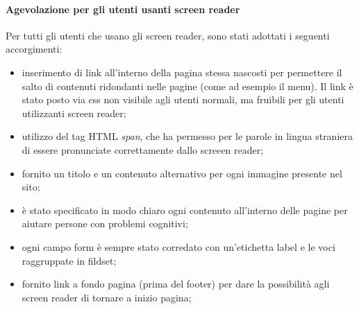 \paragraph*{Agevolazione per gli utenti usanti screen reader}Per tutti gli utenti che usano gli screen reader, sono stati adottati i seguenti accorgimenti:
\begin{itemize}

    \item inserimento di link all'interno della pagina stessa nascosti per permettere il salto di contenuti ridondanti nelle pagine (come ad esempio il menu). Il link è stato posto via css non visibile agli utenti normali, ma fruibili per gli utenti utilizzanti screen reader;
    \item utilizzo del tag HTML \textit{span}, che ha permesso per le parole in lingua straniera di essere pronunciate correttamente dallo screeen reader;
    \item fornito un titolo e un contenuto alternativo per ogni immagine presente nel sito;

    \item è stato specificato in modo chiaro ogni contenuto all'interno delle pagine per aiutare persone con problemi cognitivi;

    \item ogni campo form è sempre stato corredato con un'etichetta label e le voci raggruppate in fildset;

    \item fornito link a fondo pagina (prima del footer) per dare la possibilità agli screen reader di tornare a inizio pagina;

\end{itemize}

